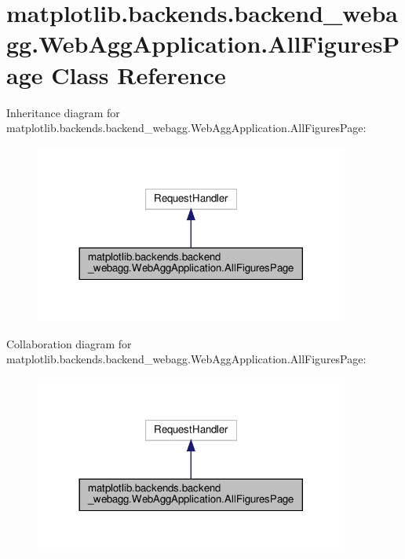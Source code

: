 \hypertarget{classmatplotlib_1_1backends_1_1backend__webagg_1_1WebAggApplication_1_1AllFiguresPage}{}\section{matplotlib.\+backends.\+backend\+\_\+webagg.\+Web\+Agg\+Application.\+All\+Figures\+Page Class Reference}
\label{classmatplotlib_1_1backends_1_1backend__webagg_1_1WebAggApplication_1_1AllFiguresPage}


Inheritance diagram for matplotlib.\+backends.\+backend\+\_\+webagg.\+Web\+Agg\+Application.\+All\+Figures\+Page\+:
\nopagebreak
\begin{figure}[H]
\begin{center}
\leavevmode
\includegraphics[width=293pt]{classmatplotlib_1_1backends_1_1backend__webagg_1_1WebAggApplication_1_1AllFiguresPage__inherit__graph}
\end{center}
\end{figure}


Collaboration diagram for matplotlib.\+backends.\+backend\+\_\+webagg.\+Web\+Agg\+Application.\+All\+Figures\+Page\+:
\nopagebreak
\begin{figure}[H]
\begin{center}
\leavevmode
\includegraphics[width=293pt]{classmatplotlib_1_1backends_1_1backend__webagg_1_1WebAggApplication_1_1AllFiguresPage__coll__graph}
\end{center}
\end{figure}
